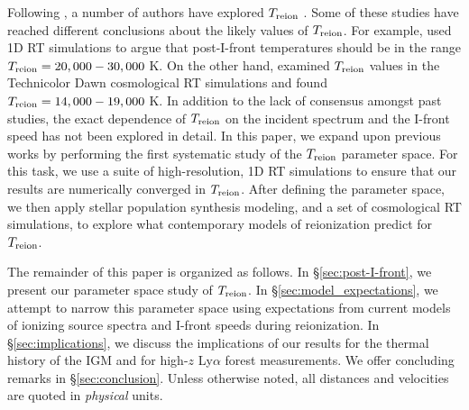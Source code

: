\documentclass[twocolumn]{aastex62}
\newcommand{\Treion}{T_{\rm reion}}
\begin{document}
Following \citet{1994MNRAS.266..343M}, a number of authors have explored $\Treion$ \citep{2007MNRAS.380.1369T, 2008ApJ...689L..81T, 2011MNRAS.417.2264V, 2012MNRAS.426.1349M, 2018arXiv180500099F}.   Some of these studies have reached different conclusions about the likely values of $\Treion$. For example, \citet{2012MNRAS.426.1349M} used 1D RT simulations to argue that post-I-front temperatures should be in the range $\Treion=20,000-30,000$ K. On the other hand, \citet{2018arXiv180500099F} examined $\Treion$ values in the Technicolor Dawn cosmological RT simulations and found $\Treion = 14,000-19,000$ K. In addition to the lack of consensus amongst past studies, the exact dependence of $\Treion$ on the incident spectrum and the I-front speed has not been explored in detail. In this paper, we expand upon previous works by performing the first systematic study of the $\Treion$ parameter space.  For this task, we use a suite of high-resolution, 1D RT simulations to ensure that our results are numerically converged in $\Treion$. After defining the parameter space, we then apply stellar population synthesis modeling, and a set of cosmological RT simulations, to explore what contemporary models of reionization predict for $\Treion$.    

The remainder of this paper is organized as follows.  In \S \ref{sec:post-I-front}, we present our parameter space study of $\Treion$.  In \S \ref{sec:model_expectations}, we attempt to narrow this parameter space using expectations from current models of ionizing source spectra and I-front speeds during reionization.  In \S \ref{sec:implications}, we discuss the implications of our results for the thermal history of the IGM and for high-$z$ Ly$\alpha$ forest measurements.   We offer concluding remarks in \S \ref{sec:conclusion}.  Unless otherwise noted, all distances and velocities are quoted in {\it physical} units.  
\end{document}
